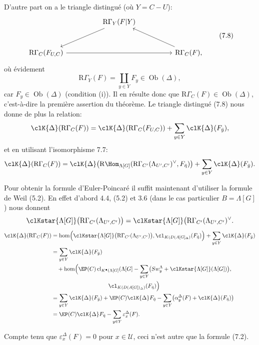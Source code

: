 D'autre part on a le triangle distingué (où $Y=C-U$):
\[
\begin{tikzcd}[column sep=huge,row sep=large]
& \mathrm{R}\Gamma_Y(F|Y) \arrow[dl] & \\
\mathrm{R}\Gamma_C(F_{U,C}) \arrow[rr] && \mathrm{R}\Gamma_C(F), \arrow[ul]
\end{tikzcd}
\tag{7.8}
\]
où évidement
\[
\mathrm{R}\Gamma_Y(F)=\coprod_{y\in Y}F_y\in\operatorname{Ob}(\Delta),
\]
car $F_y\in\operatorname{Ob}(\Delta)$ (condition (i)). Il en résulte donc que $\mathrm{R}\Gamma_C(F)\in\operatorname{Ob}(\Delta)$, c'est-à-dire la première assertion du théorème. Le triangle distingué (7.8) nous donne de plus la relation:
\[
\clK{\Delta}(\mathrm{R}\Gamma_C(F))
=
\clK{\Delta}(\mathrm{R}\Gamma_C(F_{U,C}))
+\sum_{y\in Y}\clK{\Delta}(F_{\bar y}),
\]
et en utilisant l'isomorphisme 7.7:
\[
\clK{\Delta}(\mathrm{R}\Gamma_C(F))
=
\clK{\Delta}\bigl(\mathrm{R}\Hom_{\Lambda[G]}(\mathrm{R}\Gamma_{C'}(\Lambda_{U',C'})^\vee,F_{\bar\eta})\bigr)
+\sum_{y\in Y}\clK{\Delta}(F_{\bar y}).
\]

Pour obtenir la formule d'Euler-Poincaré il suffit maintenant d'utiliser la formule de Weil (5.2). En effet d'abord 4.4, (5.2) et 3.6 (dans le cas particulier $B=\Lambda[G]$) nous donnent
\[
\clKstar{\Lambda[G]}\bigl(\mathrm{R}\Gamma_{C'}(\Lambda_{U',C'})\bigr)
=
\clKstar{\Lambda[G]}\bigl(\mathrm{R}\Gamma_{C'}(\Lambda_{U',C'})^\vee.
\]
\[
\begin{aligned}
\clK{\Delta}(\mathrm{R}\Gamma_C(F))
&=\operatorname{hom}\Bigl(
\clKstar{\Lambda[G]}\bigl(\mathrm{R}\Gamma_{C'}(\Lambda_{U',C'})\bigr),
\cl_{K(D(A[G]_\Delta)}(F_{\bar\eta})\Bigr)
 +\sum_{y\in Y}\clK{\Delta}(F_{\bar y})\\
&=\sum_{y\in Y}\clK{\Delta}(F_{\bar y})\\
&\quad +\operatorname{hom}\Bigl(
\EP(C)\operatorname{cl}_{K^{\bullet}(\Lambda[G]}(\Lambda[G]
 -\sum_{y\in Y}\bigl(Sw_y^{\Lambda}+\clKstar{\Lambda[G]}(\Lambda[G])\bigr),\\
&\hspace{10em}\cl_{K(D(A[G])_\Delta)}(F_{\bar\eta})\Bigr)\\
&=\sum_{y\in Y}\clK{\Delta}(F_{\bar y})
 +\EP(C)\clK{\Delta}F_{\bar\eta}
 -\sum_{y\in Y}\bigl(\alpha_y^\Delta(F)+\clK{\Delta}(F_{\bar\eta})\bigr)\\
&=\EP(C)\clK{\Delta}F_{\bar\eta}
 -\sum_{y\in Y}\varepsilon_x^\Delta(F).
\end{aligned}
\]

Compte tenu que $\varepsilon_x^\Delta(F)=0$ pour $x\in\mathcal{U}$, ceci n'est autre que la formule (7.2).


